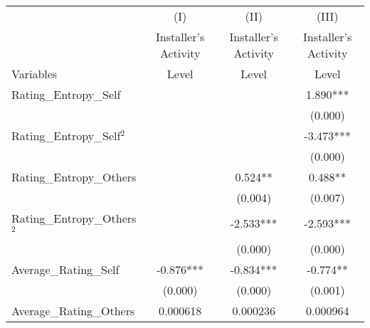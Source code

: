 \begin{table}[]
\centering
\begin{threeparttable}
\begin{tabular}{@{}lccc@{}}
\toprule
                  & (I)      & (II)    & (III)   \\  
& Installer's Activity & Installer's Activity & Installer's Activity \\
Variables & Level    & Level   & Level   \\ \midrule
Rating\_Entropy\_Self                                &                            &                            & 1.890***                   \\
                                                     &                            &                            & (0.000)                    \\
Rating\_Entropy\_Self$^2$                            &                            &                            & -3.473***                  \\
                                                     &                            &                            & (0.000)                    \\
Rating\_Entropy\_Others                              &                            & 0.524**                    & 0.488**                    \\
                                                     &                            & (0.004)                    & (0.007)                    \\
Rating\_Entropy\_Others$^2$                          &                            & -2.533***                  & -2.593***                  \\
                                                     &                            & (0.000)                    & (0.000)                    \\
Average\_Rating\_Self                                & -0.876***                  & -0.834***                  & -0.774**                   \\
                                                     & (0.000)                    & (0.000)                    & (0.001)                    \\
Average\_Rating\_Others                              & 0.000618                   & 0.000236                   & 0.000964                   \\

\end{tabular}
\end{threeparttable}
\end{table}
